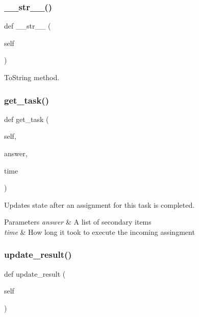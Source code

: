 \subsubsection{\texorpdfstring{\_\_str\_\_()}{\_\_str\_\_()}}
{\footnotesize\ttfamily def \+\_\+\+\_\+str\+\_\+\+\_\+ (\begin{DoxyParamCaption}\item[{}]{self }\end{DoxyParamCaption})}



To\+String method. 

\mbox{\label{classjoinapp_1_1models_1_1task__management__models_1_1_join_pair_task_a5c2eb6f87a32af834dd29469a6189f0c}} 
\subsubsection{\texorpdfstring{get\_task()}{get\_task()}}
{\footnotesize\ttfamily def get\+\_\+task (\begin{DoxyParamCaption}\item[{}]{self,  }\item[{}]{answer,  }\item[{}]{time }\end{DoxyParamCaption})}



Updates state after an assignment for this task is completed. 


\begin{DoxyParams}{Parameters}
{\em answer} & A list of secondary items \\
\hline
{\em time} & How long it took to execute the incoming assingment \\
\hline
\end{DoxyParams}
\mbox{\label{classjoinapp_1_1models_1_1task__management__models_1_1_join_pair_task_a9013f18300fef58695383b65dd3ad816}} 
\subsubsection{\texorpdfstring{update\_result()}{update\_result()}}
{\footnotesize\ttfamily def update\+\_\+result (\begin{DoxyParamCaption}\item[{}]{self }\end{DoxyParamCaption})}



